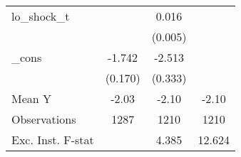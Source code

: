{\begin{tabular}{l*{3}{c}}
\addlinespace
lo\_shock\_t  &                     &       0.016\sym{***}&                     \\
            &                     &     (0.005)         &                     \\
\addlinespace
\_cons      &      -1.742\sym{***}&      -2.513\sym{***}&                     \\
            &     (0.170)         &     (0.333)         &                     \\
\midrule
Mean Y      &       -2.03         &       -2.10         &       -2.10         \\
Observations&        1287         &        1210         &        1210         \\
Exc. Inst. F-stat&                     &       4.385         &      12.624         \\
\bottomrule
\end{tabular}
}

